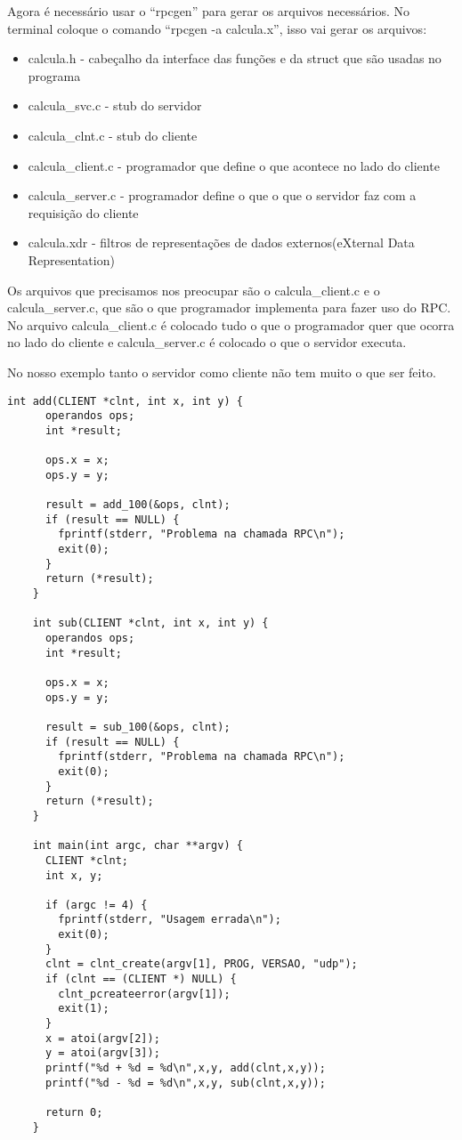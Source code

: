 \documentclass[12pt,a4paper]{article}
\begin{document}
Agora é necessário usar o ``rpcgen'' para gerar os arquivos necessários. No terminal 
coloque o comando ``rpcgen -a calcula.x'', isso vai gerar os arquivos:

\begin{itemize}
	\item calcula.h - cabeçalho da interface das funções e da struct que são usadas no programa
	\item calcula\_svc.c - stub do servidor
	\item calcula\_clnt.c - stub do cliente
	\item calcula\_client.c - programador que define o que acontece no lado do cliente
	\item calcula\_server.c - programador define o que o que o servidor faz com a requisição do cliente
	\item calcula.xdr - filtros de representações de dados externos(eXternal Data Representation)\cite{rfc1014}
\end{itemize}

Os arquivos que precisamos nos preocupar são o calcula\_client.c e o calcula\_server.c, que são
o que programador implementa para fazer uso do RPC. No arquivo calcula\_client.c é colocado tudo
o que o programador quer que ocorra no lado do cliente e calcula\_server.c é colocado o que 
o servidor executa.

No nosso exemplo tanto o servidor como cliente não tem muito o que ser feito.

\begin{lstlisting}[caption=client\_client.c]
	int add(CLIENT *clnt, int x, int y) {
	  operandos ops;
	  int *result;

	  ops.x = x;
	  ops.y = y;

	  result = add_100(&ops, clnt);
	  if (result == NULL) {
	    fprintf(stderr, "Problema na chamada RPC\n");
	    exit(0);
	  }
	  return (*result);
	}

	int sub(CLIENT *clnt, int x, int y) {
	  operandos ops;
	  int *result;

	  ops.x = x;
	  ops.y = y;

	  result = sub_100(&ops, clnt);
	  if (result == NULL) {
	    fprintf(stderr, "Problema na chamada RPC\n");
	    exit(0);
	  }
	  return (*result);
	}
	
	int main(int argc, char **argv) {
	  CLIENT *clnt;
	  int x, y;

	  if (argc != 4) {
	    fprintf(stderr, "Usagem errada\n");
	    exit(0);
	  }
	  clnt = clnt_create(argv[1], PROG, VERSAO, "udp");
	  if (clnt == (CLIENT *) NULL) {
	    clnt_pcreateerror(argv[1]);
	    exit(1);
	  }
	  x = atoi(argv[2]);
	  y = atoi(argv[3]);
	  printf("%d + %d = %d\n",x,y, add(clnt,x,y));
	  printf("%d - %d = %d\n",x,y, sub(clnt,x,y));

	  return 0;
	}
\end{lstlisting}
\end{document}
